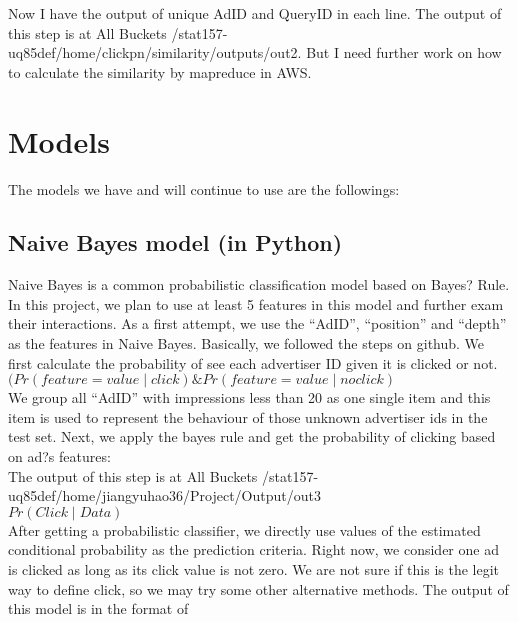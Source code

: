 \documentclass[12pt]{article}
\begin{document}
Now I have the output of unique AdID and QueryID in each line. The output of this step is at All Buckets /stat157-uq85def/home/clickpn/similarity/outputs/out2. But I need further work on how to calculate the similarity by mapreduce in AWS.\\

\section {Models}
The models we have and will continue to use are the followings:\\
\vspace{0.1\baselineskip}

\subsection {Naive Bayes model (in Python)}
Naive Bayes is a common probabilistic classification model based on Bayes? Rule. In this project, we plan to use at least 5 features in this model and further exam their interactions. As a first attempt, we use the ``AdID'', ``position'' and ``depth'' as the features in Naive Bayes. Basically, we followed the steps on github. We first calculate the probability of see each advertiser ID given it is clicked or not. \\

$(Pr(feature = value \mid click) \& Pr(feature = value \mid noclick)$\\

We group all ``AdID'' with impressions less than 20 as one single item and this item is used to represent the behaviour of those unknown advertiser ids in the test set. Next, we apply the bayes rule and get the probability of clicking based on ad?s features:\\

The output of this step is at All Buckets /stat157-uq85def/home/jiangyuhao36/Project/Output/out3\\

$Pr(Click \mid Data)$\\

After getting a probabilistic classifier, we directly use values of the estimated conditional probability as the prediction criteria. Right now, we consider one ad is clicked as long as its click value is not zero. We are not sure if this is the legit way to define click, so we may try some other alternative methods. The output of this model is in the format of\\
\end{document}
